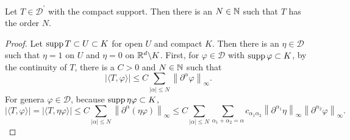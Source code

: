 \begin{enumerate}[label=\arabic*.]
	\begin{prop}
		Let $T \in \mathcal{D}^\prime$ with the compact support. Then there is an $N \in \mathbb{N}$ such that $T$ has the order $N$.
	\end{prop}
	\begin{proof}
		Let $\operatorname{supp} T \subset U \subset K$ for open $U$ and compact $K$. Then there is an $\eta \in \mathcal{D}$ such that $\eta = 1$ on $U$ and $\eta = 0$ on $\mathbb{R}^d \backslash K$. First, for $\varphi \in \mathcal{D}$ with $\operatorname{supp} \varphi \subset K$, by the continuity of $T$, there is a $C > 0$ and $N \in \mathbb{N}$ such that
		\begin{equation*}
			|\langle T, \varphi\rangle| \leq C \sum_{|\alpha| \leq N}\left\|\partial^\alpha \varphi\right\|_{\infty} .
		\end{equation*}
		For genera $\varphi \in \mathcal{D}$, because $\operatorname{supp} \eta \varphi \subset K$,
		\begin{equation*}
			|\langle T, \varphi\rangle|=|\langle T, \eta \varphi\rangle| \leq C \sum_{|\alpha| \leq N}\left\|\partial^\alpha(\eta \varphi)\right\|_{\infty} \leq C \sum_{|\alpha| \leq N} \sum_{\alpha_1+\alpha_2=\alpha} c_{\alpha_1 \alpha_2}\left\|\partial^{\alpha_1} \eta\right\|_{\infty}\left\|\partial^{\alpha_2} \varphi\right\|_{\infty} .
		\end{equation*}
	\end{proof}


\end{enumerate}
